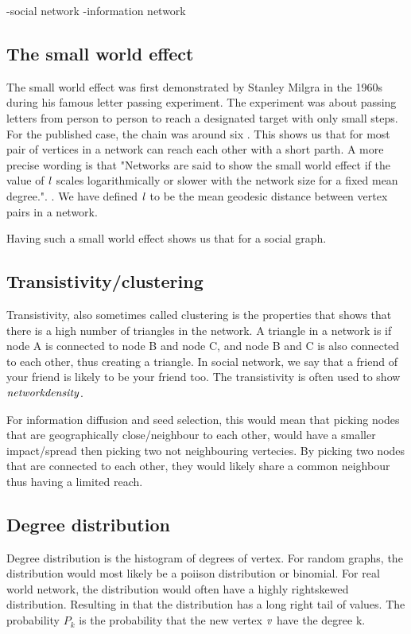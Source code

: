 -social network
-information network



\subsection{The small world effect}
The small world effect was first demonstrated by Stanley Milgra in the 1960s during his famous letter passing experiment\cite{SmallWorldProblemSmilgram1960}. The experiment was about passing letters from person to person to reach a designated target with only small steps. For the published case, the chain was around six \cite{Experiment1969}. This shows us that for most pair of vertices in a network can reach each other with a short parth. A more precise wording is that "Networks are said to show the small world effect if the value of $\it{l}$ scales logarithmically or slower with the network size for a fixed mean degree.". \cite{ComplexNetwork2003}. We have defined $\it{l} $ to be the mean geodesic distance between vertex pairs in a network.

Having such a small world effect shows us that for a social graph.

\subsection{Transistivity/clustering}
Transistivity, also sometimes called clustering is the properties that shows that there is a high number of triangles in the network. A triangle in a network is if node A is connected to node B and node C, and node B and C is also connected to each other, thus creating a triangle. In social network, we say that a friend of your friend is likely to be your friend too\cite{ComplexNetwork2003}. The transistivity is often used to show $\it{network density}$.

For information diffusion and seed selection, this would mean that picking nodes that are geographically close/neighbour to each other, would have a smaller impact/spread then picking two not neighbouring vertecies. By picking two nodes that are connected to each other, they would likely share a common neighbour thus having a limited reach.  

\subsection{Degree distribution}
Degree distribution is the histogram of degrees of vertex. For random graphs, the distribution would most likely be a poiison distribution or binomial. For real world network, the distribution would often have a highly rightskewed distribution. Resulting in that the distribution has a long right tail of values. The probability $P_k$ is the probability that the new vertex $\it{v}$ have the degree k. 

